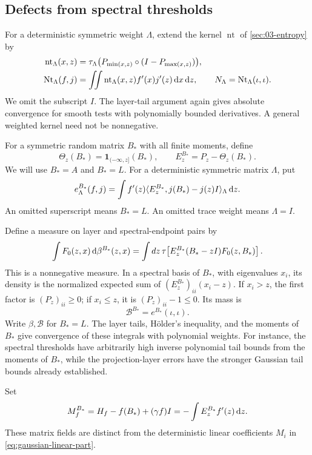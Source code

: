 \subsection{Defects from spectral thresholds}

For a deterministic symmetric weight $\Lambda$, extend the kernel $\operatorname{nt}$ of \cref{sec:03-entropy} by
\[
 \begin{aligned}
 \operatorname{nt}_\Lambda(x,z)
 &=\tau_\Lambda\bigl(P_{\min(x,z)}\circ(I-P_{\max(x,z)})\bigr),\\
 \operatorname{Nt}_\Lambda(f,j)
 &=\iint\operatorname{nt}_\Lambda(x,z)f'(x)j'(z)\,\mathrm{d} x\,\mathrm{d} z,
 \qquad N_\Lambda=\operatorname{Nt}_\Lambda(\iota,\iota).
 \end{aligned}
\]
We omit the subscript $I$. The layer-tail argument again gives absolute convergence for smooth tests with polynomially bounded derivatives. A general weighted kernel need not be nonnegative.

For a symmetric random matrix $B_*$ with all finite moments, define
\[
 \Theta_z(B_*)=\mathbf1_{(-\infty,z]}(B_*),\qquad
 E_z^{B_*}=P_z-\Theta_z(B_*).
\]
We will use $B_*=A$ and $B_*=L$. For a deterministic symmetric matrix $\Lambda$, put
\[
 e_\Lambda^{B_*}(f,j)
  =\int f'(z)
      \langle E_z^{B_*},j(B_*)-j(z)I\rangle_\Lambda\,\mathrm{d} z.
\]
An omitted superscript means $B_*=L$. An omitted trace weight means $\Lambda=I$.

Define a measure on layer and spectral-endpoint pairs by
\[
 \int F_0(z,x)\,\mathrm{d} \beta^{B_*}(z,x)
   =\int dz\,\tau\!\left[
       E_z^{B_*}(B_*-zI)F_0(z,B_*)\right].
\]
This is a nonnegative measure. In a spectral basis of $B_*$, with eigenvalues $x_i$, its density is the normalized expected sum of $(E_z^{B_*})_{ii}(x_i-z)$. If $x_i>z$, the first factor is $(P_z)_{ii}\geq0$; if $x_i\leq z$, it is $(P_z)_{ii}-1\leq0$. Its mass is
\[
 \mathcal{B}^{B_*}=e^{B_*}(\iota,\iota).
\]
Write $\beta,\mathcal{B}$ for $B_*=L$. The layer tails, H\"older's inequality, and the moments of $B_*$ give convergence of these integrals with polynomial weights. For instance, the spectral thresholds have arbitrarily high inverse polynomial tail bounds from the moments of $B_*$, while the projection-layer errors have the stronger Gaussian tail bounds already established.

Set
\[
 M_f^{B_*}
    =H_f-f(B_*)+(\gamma f)I
    =-\int E_z^{B_*}f'(z)\,\mathrm{d} z.
\]
These matrix fields are distinct from the deterministic linear coefficients $M_i$ in \eqref{eq:gaussian-linear-part}.

